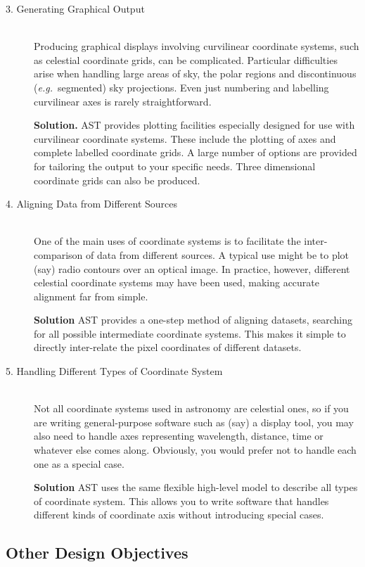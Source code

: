 \documentclass[twoside,11pt]{article}
\begin{document}
\begin{description}
\item[3. Generating Graphical Output]\mbox{}\\
Producing graphical displays involving curvilinear coordinate systems,
such as celestial coordinate grids, can be complicated. Particular
difficulties arise when handling large areas of sky, the polar regions
and discontinuous ({\em{e.g.}}\ segmented) sky projections.  Even just
numbering and labelling curvilinear axes is rarely straightforward.

{\bf{Solution.}} AST provides plotting facilities especially designed
for use with curvilinear coordinate systems. These include the
plotting of axes and complete labelled coordinate grids.  A large
number of options are provided for tailoring the output to your
specific needs. Three dimensional coordinate grids can also be produced.

\item[4. Aligning Data from Different Sources]\mbox{}\\
One of the main uses of coordinate systems is to facilitate the
inter-comparison of data from different sources. A typical use might
be to plot (say) radio contours over an optical image.  In practice,
however, different celestial coordinate systems may have been used,
making accurate alignment far from simple.

{\bf{Solution}} AST provides a one-step method of aligning datasets,
searching for all possible intermediate coordinate systems.  This
makes it simple to directly inter-relate the pixel coordinates of
different datasets.

\item[5. Handling Different Types of Coordinate System]\mbox{}\\
Not all coordinate systems used in astronomy are celestial ones, so if
you are writing general-purpose software such as (say) a display tool,
you may also need to handle axes representing wavelength, distance,
time or whatever else comes along. Obviously, you would prefer not to
handle each one as a special case.

{\bf{Solution}} AST uses the same flexible high-level model to
describe all types of coordinate system. This allows you to write
software that handles different kinds of coordinate axis without
introducing special cases.
\end{description}

\subsection{Other Design Objectives}
\end{document}

